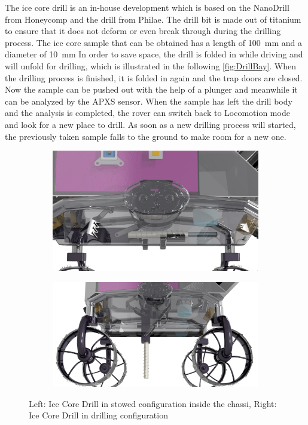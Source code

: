 The ice core drill is an in-house development which is based on the NanoDrill from Honeycomp and the drill from Philae. The drill bit is made out of titanium to ensure that it does not deform or even break through during the drilling process.
The ice core sample that can be obtained has a length of 100~mm and a diameter of 10~mm
In order to save space, the drill is folded in while driving and will unfold for drilling, which is illustrated in the following \autoref{fig:DrillBay}.
When the drilling process is finished, it is folded in again and the trap doors are closed.
Now the sample can be pushed out with the help of a plunger and meanwhile it can be analyzed by the APXS sensor. 
When the sample has left the drill body and the analysis is completed, the rover can switch back to Locomotion mode and look for a new place to drill. As soon as a new drilling process will started, the previously taken sample falls to the ground to make room for a new one.


\begin{figure}[htb]
     \centering
     \begin{subfigure}[b]{0.45\textwidth}
         \centering
         \includegraphics[width=\textwidth]{Media/DrillingBay3}
         \label{fig:stowedDrill}
     \end{subfigure}
     \hfill
     \begin{subfigure}[b]{0.45\textwidth}
         \centering
         \includegraphics[width=\textwidth]{Media/DrillingBay_unfolded2}
         \label{fig:drillconfig}
     \end{subfigure}
     \hfill
     \caption{Left: Ice Core Drill in stowed configuration inside the chassi, Right: Ice Core Drill in drilling configuration}
     \label{fig:DrillBay}
\end{figure}

